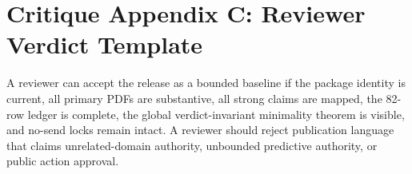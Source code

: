 \documentclass[11pt,a4paper]{article}
\begin{document}
\clearpage
\section*{Critique Appendix C: Reviewer Verdict Template}
A reviewer can accept the release as a bounded baseline if the package identity is current, all primary PDFs are substantive, all strong claims are mapped, the 82-row ledger is complete, the global verdict-invariant minimality theorem is visible, and no-send locks remain intact. A reviewer should reject publication language that claims unrelated-domain authority, unbounded predictive authority, or public action approval.
\end{document}
